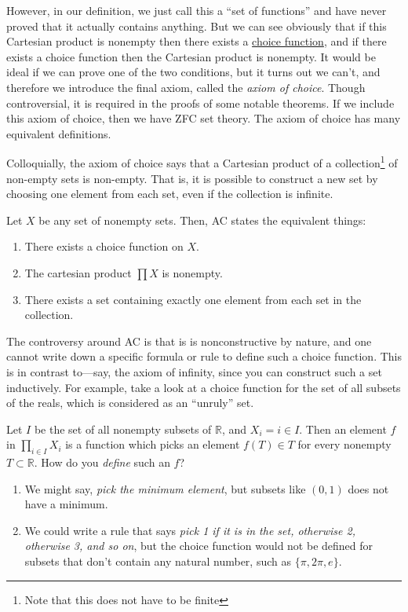   However, in our definition, we just call this a ``set of functions'' and have never proved that it actually contains anything. But we can see obviously that if this Cartesian product is nonempty then there exists a \hyperref[def:choice-function]{choice function}, and if there exists a choice function then the Cartesian product is nonempty. It would be ideal if we can prove one of the two conditions, but it turns out we can't, and therefore we introduce the final axiom, called the \textit{axiom of choice}. Though controversial, it is required in the proofs of some notable theorems. If we include this axiom of choice, then we have ZFC set theory. The axiom of choice has many equivalent definitions. 

  Colloquially, the axiom of choice says that a Cartesian product of a collection\footnote{Note that this does not have to be finite} of non-empty sets is non-empty. That is, it is possible to construct a new set by choosing one element from each set, even if the collection is infinite. 

  \begin{axiom}
    \label{thm:axiom-of-choice} 
    Let $X$ be any set of nonempty sets. Then, AC states the equivalent things: 
    \begin{enumerate}
      \item There exists a choice function on $X$. 
      \item The cartesian product $\prod X$ is nonempty. 
      \item There exists a set containing exactly one element from each set in the collection. 
    \end{enumerate}
  \end{axiom} 

  The controversy around AC is that is is nonconstructive by nature, and one cannot write down a specific formula or rule to define such a choice function. This is in contrast to---say, the axiom of infinity, since you can construct such a set inductively. For example, take a look at a choice function for the set of all subsets of the reals, which is considered as an ``unruly'' set. 

  \begin{example}
    \label{ex:choice-function-on-power-set-of-reals}
    Let $I$ be the set of all nonempty subsets of $\mathbb{R}$, and $X_i = i \in I$. Then an element $f$ in $\prod_{i \in I} X_i$ is a function which picks an element $f(T) \in T$ for every nonempty $T \subset \mathbb{R}$. How do you \textit{define} such an $f$? 
    \begin{enumerate}
      \item We might say, \textit{pick the minimum element}, but subsets like $(0, 1)$ does not have a minimum. 
      \item We could write a rule that says \textit{pick 1 if it is in the set, otherwise 2, otherwise 3, and so on}, but the choice function would not be defined for subsets that don't contain any natural number, such as $\{\pi, 2 \pi, e\}$. 
    \end{enumerate}
  \end{example}


